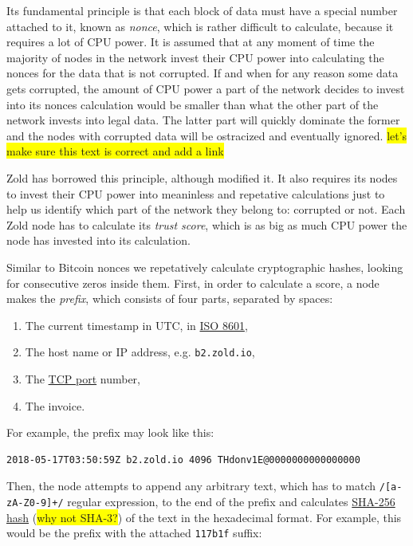 \documentclass[11pt,oneside]{article}
\newcommand\dd[1]{\colorbox{gray!30}{\texttt{#1}}}
\begin{document}
Its fundamental principle is that each block of data must have a special
number attached to it, known as \emph{nonce}, which is rather difficult to calculate,
because it requires a lot of CPU power. It is assumed that at any moment
of time the majority of nodes in the network invest their CPU power into
calculating the nonces for the data that is not corrupted. If and when for any reason
some data gets corrupted, the amount of CPU power a part of the network
decides to invest into its nonces calculation would be smaller than what
the other part of the network invests into legal data. The latter part
will quickly dominate the former and the nodes with corrupted data will
be ostracized and eventually ignored.
\colorbox{yellow}{let's make sure this text is correct and add a link}

Zold has borrowed this principle, although modified it. It also requires
its nodes to invest their CPU power into meaninless and repetative
calculations just to help us identify which part of the network they belong to:
corrupted or not. Each Zold node has to calculate its \emph{trust score},
which is as big as much CPU power the node has invested into its calculation.

Similar to Bitcoin nonces we repetatively calculate cryptographic hashes,
looking for consecutive zeros inside them. First, in order to calculate a score,
a node makes the \emph{prefix}, which consists of four parts,
separated by spaces:

\begin{enumerate}
\item The current timestamp in UTC, in \href{https://en.wikipedia.org/wiki/ISO_8601}{ISO 8601},
\item The host name or IP address, e.g. \dd{b2.zold.io},
\item The \href{https://en.wikipedia.org/wiki/Port_(computer_networking)}{TCP port} number,
\item The invoice.
\end{enumerate}

For example, the prefix may look like this:

\begin{verbatim}
2018-05-17T03:50:59Z b2.zold.io 4096 THdonv1E@0000000000000000
\end{verbatim}

Then, the node attempts to append any arbitrary text, which has to match
\dd{/[a-zA-Z0-9]+/} regular expression, to the end of the prefix and calculates
\href{https://en.wikipedia.org/wiki/SHA-2}{SHA-256 hash} (\colorbox{yellow}{why not SHA-3?})
of the text in the hexadecimal format. For example, this would be the prefix
with the attached \dd{117b1f} suffix:
\end{document}
